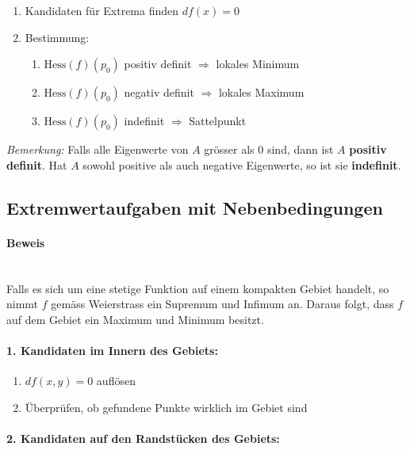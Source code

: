 \documentclass[11pt]{article}
\begin{document}
\begin{enumerate}[noitemsep]
	\item Kandidaten f{\"u}r Extrema finden $df(x)=0$
	\item Bestimmung:
	\begin{enumerate}[noitemsep]
		\item $\text{Hess}(f)(p_0)$ positiv definit $\Rightarrow$ lokales Minimum
		\item $\text{Hess}(f)(p_0)$ negativ definit $\Rightarrow$ lokales Maximum
		\item $\text{Hess}(f)(p_0)$ indefinit $\Rightarrow$ Sattelpunkt
	\end{enumerate}
\end{enumerate}

\emph{Bemerkung:} Falls alle Eigenwerte von $A$ gr{\"o}sser als $0$ sind, dann ist $A$ \textbf{positiv definit}. Hat $A$ sowohl positive als auch negative Eigenwerte, so ist sie \textbf{indefinit}.

\subsection{Extremwertaufgaben mit Nebenbedingungen}

\paragraph{Beweis}\mbox{}\\

Falls es sich um eine stetige Funktion auf einem kompakten Gebiet handelt, so nimmt $f$ gem{\"a}ss Weierstrass ein Supremum und Infimum an. Daraus folgt, dass $f$ auf dem Gebiet ein Maximum und Minimum besitzt.

\paragraph{1. Kandidaten im Innern des Gebiets:}

\begin{enumerate}[noitemsep, label=\roman*]
	\item $df(x,y) = 0$ aufl{\"o}sen
	\item {\"U}berpr{\"u}fen, ob gefundene Punkte wirklich im Gebiet sind
\end{enumerate}

\paragraph{2. Kandidaten auf den Randst{\"u}cken des Gebiets:}
\end{document}
